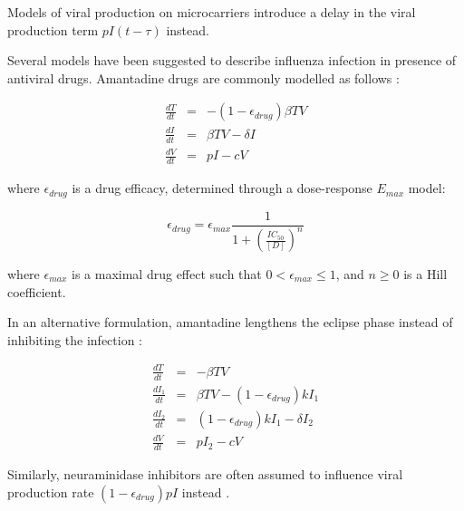 Models of viral production on microcarriers \cite{mohler2005mathematical,schulze2009infection} introduce a delay in the viral production term $p I(t - \tau)$ instead.

Several models have been suggested to describe influenza infection in presence of antiviral drugs. Amantadine drugs are commonly modelled as follows \cite{beauchemin2008modeling}:

\begin{equation}
\begin{array}{rcl}
\frac{dT}{dt} &=& - (1-\epsilon_{drug})\beta T V \\
\frac{dI}{dt} &=& \beta T V - \delta I \\
\frac{dV}{dt} &=& p I - c V
\end{array}
\end{equation}

where $\epsilon_{drug}$ is a drug efficacy, determined through a dose-response $E_{max}$ model:

\begin{equation}
\epsilon_{drug} = \epsilon_{max}\frac{1}{1 + (\frac{IC_{50}}{[D]})^{n}}
\end{equation}

where $\epsilon_{max}$ is a maximal drug effect such that $0 < \epsilon_{max} \le 1$, and $n \ge 0$ is a Hill coefficient.

In an alternative formulation, amantadine lengthens the eclipse phase instead of inhibiting the infection \cite{beauchemin2008modeling}:

\begin{equation}
\begin{array}{rcl}
\frac{dT}{dt} &=& - \beta T V \\
\frac{dI_1}{dt} &=& \beta T V - (1-\epsilon_{drug}) k I_1 \\
\frac{dI_2}{dt} &=& (1-\epsilon_{drug}) k I_1 - \delta I_2 \\
\frac{dV}{dt} &=& p I_2 - c V
\end{array}
\end{equation}

Similarly, neuraminidase inhibitors are often assumed to influence viral production rate $(1-\epsilon_{drug}) p I$ instead \cite{handel2007neuraminidase}.